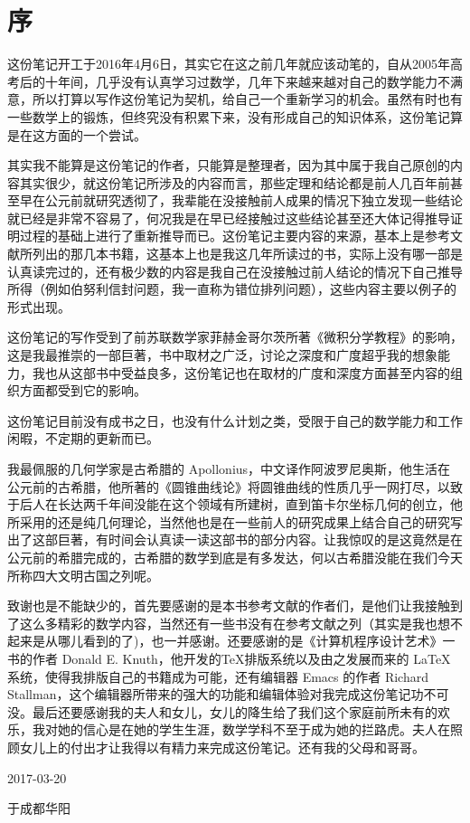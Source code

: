 
\chapter*{序}

这份笔记开工于2016年4月6日，其实它在这之前几年就应该动笔的，自从2005年高考后的十年间，几乎没有认真学习过数学，几年下来越来越对自己的数学能力不满意，所以打算以写作这份笔记为契机，给自己一个重新学习的机会。虽然有时也有一些数学上的锻炼，但终究没有积累下来，没有形成自己的知识体系，这份笔记算是在这方面的一个尝试。

其实我不能算是这份笔记的作者，只能算是整理者，因为其中属于我自己原创的内容其实很少，就这份笔记所涉及的内容而言，那些定理和结论都是前人几百年前甚至早在公元前就研究透彻了，我辈能在没接触前人成果的情况下独立发现一些结论就已经是非常不容易了，何况我是在早已经接触过这些结论甚至还大体记得推导证明过程的基础上进行了重新推导而已。这份笔记主要内容的来源，基本上是参考文献所列出的那几本书籍，这基本上也是我这几年所读过的书，实际上没有哪一部是认真读完过的，还有极少数的内容是我自己在没接触过前人结论的情况下自己推导所得（例如伯努利信封问题，我一直称为错位排列问题），这些内容主要以例子的形式出现。

这份笔记的写作受到了前苏联数学家菲赫金哥尔茨所著《微积分学教程》的影响，这是我最推崇的一部巨著，书中取材之广泛，讨论之深度和广度超乎我的想象能力，我也从这部书中受益良多，这份笔记也在取材的广度和深度方面甚至内容的组织方面都受到它的影响。

这份笔记目前没有成书之日，也没有什么计划之类，受限于自己的数学能力和工作闲暇，不定期的更新而已。

我最佩服的几何学家是古希腊的 Apollonius，中文译作阿波罗尼奥斯，他生活在公元前的古希腊，他所著的《圆锥曲线论》将圆锥曲线的性质几乎一网打尽，以致于后人在长达两千年间没能在这个领域有所建树，直到笛卡尔坐标几何的创立，他所采用的还是纯几何理论，当然他也是在一些前人的研究成果上结合自己的研究写出了这部巨著，有时间会认真读一读这部书的部分内容。让我惊叹的是这竟然是在公元前的希腊完成的，古希腊的数学到底是有多发达，何以古希腊没能在我们今天所称四大文明古国之列呢。

致谢也是不能缺少的，首先要感谢的是本书参考文献的作者们，是他们让我接触到了这么多精彩的数学内容，当然还有一些书没有在参考文献之列（其实是我也想不起来是从哪儿看到的了)，也一并感谢。还要感谢的是《计算机程序设计艺术》一书的作者 Donald E. Knuth，他开发的\TeX 排版系统以及由之发展而来的 \LaTeX 系统，使得我排版自己的书籍成为可能，还有编辑器 Emacs 的作者 Richard Stallman，这个编辑器所带来的强大的功能和编辑体验对我完成这份笔记功不可没。最后还要感谢我的夫人和女儿，女儿的降生给了我们这个家庭前所未有的欢乐，我对她的信心是在她的学生生涯，数学学科不至于成为她的拦路虎。夫人在照顾女儿上的付出才让我得以有精力来完成这份笔记。还有我的父母和哥哥。

\vspace{1.5cm}

\hfill 2017-03-20 \ \ \ \ \ 

\hfill 于成都华阳 \ \ \ \ \ 


